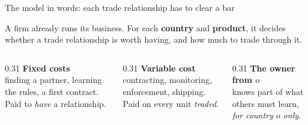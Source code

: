 \documentclass[11pt,aspectratio=169,notes]{beamer}
\newcommand{\hl}[1]{{\color{owner}#1}}
\newcommand{\ac}[1]{{\color{accent}#1}}
\begin{document}
\begin{frame}{The model in words: each trade relationship has to clear a bar}
\vspace{0.3cm}
\begin{wordsbox}[fontupper=\normalsize]
A firm already runs its business. For each \textbf{country} and \textbf{product}, it decides whether a trade relationship is worth having, and how much to trade through it.
\end{wordsbox}
\vspace{0.2cm}
\begin{columns}[T]
\begin{column}{0.31\textwidth}
\textbf{\ac{Fixed costs}}\\ {\small finding a partner, learning the rules, a first contract. Paid to \emph{have} a relationship.}
\end{column}
\begin{column}{0.31\textwidth}
\textbf{\ac{Variable cost}}\\ {\small contracting, monitoring, enforcement, shipping. Paid on every unit \emph{traded}.}
\end{column}
\begin{column}{0.31\textwidth}
\textbf{\hl{The owner from $o$}}\\ {\small knows part of what others must learn, \emph{for country $o$ only}.}
\end{column}
\end{columns}
\vspace{0.3cm}
\end{frame}
\end{document}
